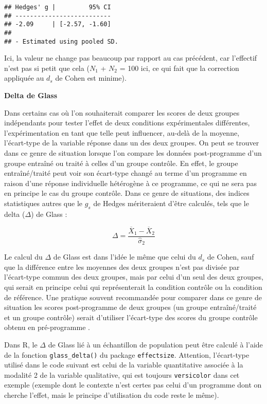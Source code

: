 \documentclass[
  french,
]{book}
\begin{document}
\begin{verbatim}
## Hedges' g |         95% CI
## --------------------------
## -2.09     | [-2.57, -1.60]
## 
## - Estimated using pooled SD.
\end{verbatim}

Ici, la valeur ne change pas beaucoup par rapport au cas précédent, car l'effectif n'est pas si petit que cela (\(N_{1}\) + \(N_{2}\) = 100 ici, ce qui fait que la correction appliquée au \(d_{s}\) de Cohen est minime).

\textbf{Delta de Glass}

Dans certains cas où l'on souhaiterait comparer les scores de deux groupes indépendants pour tester l'effet de deux conditions expérimentales différentes, l'expérimentation en tant que telle peut influencer, au-delà de la moyenne, l'écart-type de la variable réponse dans un des deux groupes. On peut se trouver dans ce genre de situation lorsque l'on compare les données post-programme d'un groupe entraîné ou traité à celles d'un groupe contrôle. En effet, le groupe entraîné/traité peut voir son écart-type changé au terme d'un programme en raison d'une réponse individuelle hétérogène à ce programme, ce qui ne sera pas en principe le cas du groupe contrôle. Dans ce genre de situations, des indices statistiques autres que le \(g_{s}\) de Hedges mériteraient d'être calculés, tels que le delta (\(\Delta\)) de Glass \autocite{lakensCalculatingReportingEffect2013} :

\[\Delta = \frac{\overline{X}_{1} - \overline{X}_{2}} {\hat{\sigma}_{2}}\]

Le calcul du \(\Delta\) de Glass est dans l'idée le même que celui du \(d_{s}\) de Cohen, sauf que la différence entre les moyennes des deux groupes n'est pas divisée par l'écart-type commun des deux groupes, mais par celui d'un seul des deux groupes, qui serait en principe celui qui représenterait la condition contrôle ou la condition de référence. Une pratique souvent recommandée pour comparer dans ce genre de situation les scores post-programme de deux groupes (un groupe entraîné/traité et un groupe contrôle) serait d'utiliser l'écart-type des scores du groupe contrôle obtenu en pré-programme \autocite{lakensCalculatingReportingEffect2013}.

Dans R, le \(\Delta\) de Glass lié à un échantillon de population peut être calculé à l'aide de la fonction \texttt{glass\_delta()} du package \texttt{effectsize}. Attention, l'écart-type utilisé dans le code suivant est celui de la variable quantitative associée à la modalité 2 de la variable qualitative, qui est toujours \texttt{versicolor} dans cet exemple (exemple dont le contexte n'est certes pas celui d'un programme dont on cherche l'effet, mais le principe d'utilisation du code reste le même).
\end{document}
